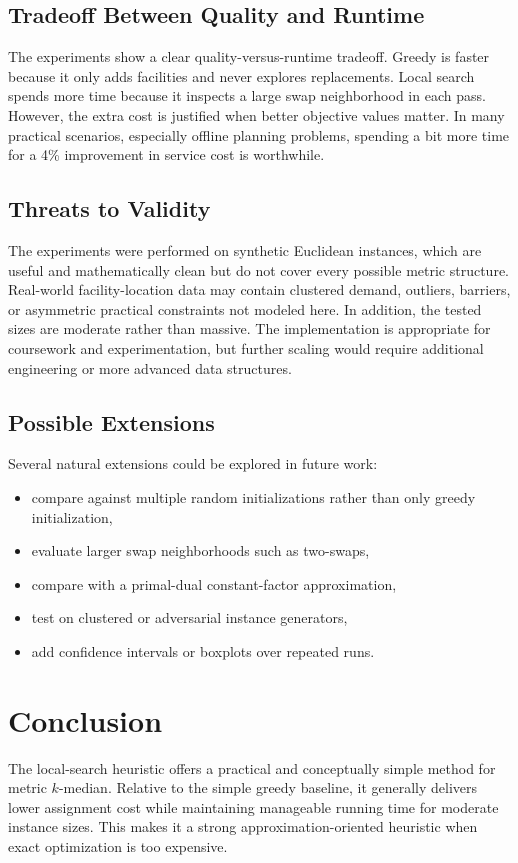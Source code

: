 \documentclass[11pt]{article}
\begin{document}
\subsection{Tradeoff Between Quality and Runtime}
The experiments show a clear quality-versus-runtime tradeoff. Greedy is faster because it only adds facilities and never explores replacements. Local search spends more time because it inspects a large swap neighborhood in each pass. However, the extra cost is justified when better objective values matter. In many practical scenarios, especially offline planning problems, spending a bit more time for a 4\% improvement in service cost is worthwhile.

\subsection{Threats to Validity}
The experiments were performed on synthetic Euclidean instances, which are useful and mathematically clean but do not cover every possible metric structure. Real-world facility-location data may contain clustered demand, outliers, barriers, or asymmetric practical constraints not modeled here. In addition, the tested sizes are moderate rather than massive. The implementation is appropriate for coursework and experimentation, but further scaling would require additional engineering or more advanced data structures.

\subsection{Possible Extensions}
Several natural extensions could be explored in future work:
\begin{itemize}
    \item compare against multiple random initializations rather than only greedy initialization,
    \item evaluate larger swap neighborhoods such as two-swaps,
    \item compare with a primal-dual constant-factor approximation,
    \item test on clustered or adversarial instance generators,
    \item add confidence intervals or boxplots over repeated runs.
\end{itemize}

\section{Conclusion}
The local-search heuristic offers a practical and conceptually simple method for metric $k$-median. Relative to the simple greedy baseline, it generally delivers lower assignment cost while maintaining manageable running time for moderate instance sizes. This makes it a strong approximation-oriented heuristic when exact optimization is too expensive.
\end{document}
